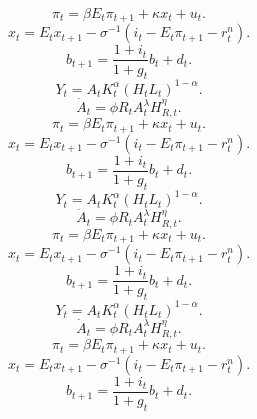 \documentclass[preprint,12pt]{elsarticle}
\begin{document}
\begin{equation}\pi_t = \beta E_t\pi_{t+1} + \kappa x_t + u_t.\end{equation}
\begin{equation}x_t = E_t x_{t+1} - \sigma^{-1}(i_t-E_t\pi_{t+1}-r_t^n).\end{equation}
\begin{equation}b_{t+1}=\frac{1+i_t}{1+g_t}b_t+d_t.\end{equation}
\begin{equation}Y_t = A_t K_t^{\alpha}(H_tL_t)^{1-\alpha}.\end{equation}
\begin{equation}\dot A_t = \phi R_t A_t^{\lambda} H_{R,t}^{\eta}.\end{equation}
\begin{equation}\pi_t = \beta E_t\pi_{t+1} + \kappa x_t + u_t.\end{equation}
\begin{equation}x_t = E_t x_{t+1} - \sigma^{-1}(i_t-E_t\pi_{t+1}-r_t^n).\end{equation}
\begin{equation}b_{t+1}=\frac{1+i_t}{1+g_t}b_t+d_t.\end{equation}
\begin{equation}Y_t = A_t K_t^{\alpha}(H_tL_t)^{1-\alpha}.\end{equation}
\begin{equation}\dot A_t = \phi R_t A_t^{\lambda} H_{R,t}^{\eta}.\end{equation}
\begin{equation}\pi_t = \beta E_t\pi_{t+1} + \kappa x_t + u_t.\end{equation}
\begin{equation}x_t = E_t x_{t+1} - \sigma^{-1}(i_t-E_t\pi_{t+1}-r_t^n).\end{equation}
\begin{equation}b_{t+1}=\frac{1+i_t}{1+g_t}b_t+d_t.\end{equation}
\begin{equation}Y_t = A_t K_t^{\alpha}(H_tL_t)^{1-\alpha}.\end{equation}
\begin{equation}\dot A_t = \phi R_t A_t^{\lambda} H_{R,t}^{\eta}.\end{equation}
\begin{equation}\pi_t = \beta E_t\pi_{t+1} + \kappa x_t + u_t.\end{equation}
\begin{equation}x_t = E_t x_{t+1} - \sigma^{-1}(i_t-E_t\pi_{t+1}-r_t^n).\end{equation}
\begin{equation}b_{t+1}=\frac{1+i_t}{1+g_t}b_t+d_t.\end{equation}
\end{document}
